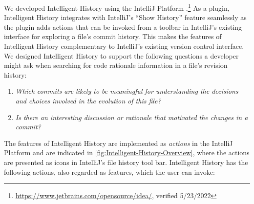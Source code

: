 We developed Intelligent History using the IntelliJ Platform .\footnote{\url{https://www.jetbrains.com/opensource/idea/}, verified 5/23/2022}
As a plugin, Intelligent History integrates with IntelliJ's ``Show History'' feature seamlessly as the plugin adds actions that can be invoked from a toolbar in IntelliJ's existing interface for exploring a file's commit history. 
This makes the features of Intelligent History complementary to IntelliJ's existing version control interface.
We designed Intelligent History to support the following questions a developer might ask when searching for code rationale information in a file's revision history:

\begin{enumerate}[label={(\arabic*)}]
    \item \textit{Which commits are likely to be meaningful for understanding the decisions and choices involved in the evolution of this file?}
    \item \textit{Is there an interesting discussion or rationale that motivated the changes in a commit?}
\end{enumerate}

The features of Intelligent History are implemented as \emph{actions} in the IntelliJ Platform  
and are indicated in \autoref{fig:Intelligent-History-Overview}, 
where the actions are presented as icons in IntelliJ's  file history tool bar.
Intelligent History has the following actions, also regarded as features, which the user can invoke:

